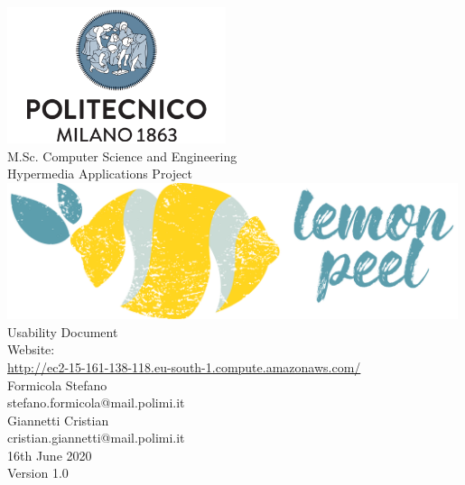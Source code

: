 \documentclass{report}
\begin{document}
	\begin{titlepage}
		\centering
		\vfill
		{
			\includegraphics[width =\linewidth, height = 4cm, keepaspectratio]{PolitecnicoLogo.png}
			\label{fig:PolitecnicoLogo}
			\large \\[2ex]M.Sc. Computer Science and Engineering\\
			\large Hypermedia Applications Project\\[12ex]
			\includegraphics[width =\linewidth, height = 4cm, keepaspectratio]{LemonPeelLogo.png}\\[12ex]

			\huge Usability Document\\[1.5ex]

			\normalsize Website:\\
				 \href{http://ec2-15-161-138-118.eu-south-1.compute.amazonaws.com/}{http://ec2-15-161-138-118.eu-south-1.compute.amazonaws.com/}\\[1.5ex]
			\normalsize Formicola Stefano\\[0.5ex]
			\normalsize stefano.formicola@mail.polimi.it\\[1.5ex]
			\normalsize Giannetti Cristian\\[0.5ex]
			\normalsize cristian.giannetti@mail.polimi.it\\[1.5ex]
			\normalsize 16th June 2020\\[1.5ex]
			\normalsize Version 1.0
		}

	\end{titlepage}

	\newpage

	
	\addtocounter{page}{1}

	\clearpage
	\tableofcontents
	\thispagestyle{fancy}
	
	\newpage
	
	
	
	
	
	
	\thispagestyle{fancy}
	
\end{document}
